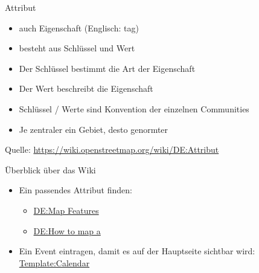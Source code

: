 \documentclass{beamer}
\begin{document}
\begin{frame}{Attribut}
\begin{itemize}
  \item auch Eigenschaft (Englisch: tag)
  \item besteht aus Schlüssel und Wert
  \item Der Schlüssel bestimmt die Art der Eigenschaft
  \item Der Wert beschreibt die Eigenschaft
  \item Schlüssel / Werte sind Konvention der einzelnen Communities
  \item Je zentraler ein Gebiet, desto genormter
\end{itemize}
Quelle: \url{https://wiki.openstreetmap.org/wiki/DE:Attribut}
\end{frame}

\begin{frame}{Überblick über das Wiki}
\begin{itemize}
  \item Ein passendes Attribut finden:
  \begin{itemize}
    \item \href{https://wiki.openstreetmap.org/wiki/DE:Map_Features}{DE:Map Features}
    \item \href{https://wiki.openstreetmap.org/wiki/DE:How_to_map_a}{DE:How to map a}
  \end{itemize}
  \item Ein Event eintragen, damit es auf der Hauptseite sichtbar wird: \href{https://wiki.openstreetmap.org/wiki/Template:Calendar}{Template:Calendar}
\end{itemize}
\end{frame}
\end{document}

